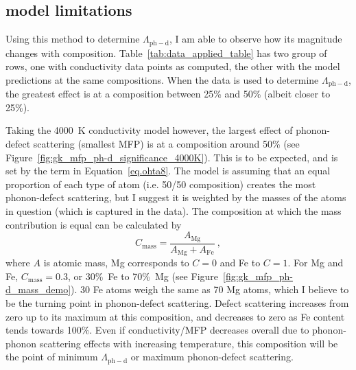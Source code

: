  





%
%



\subsection{\cocs model limitations}

Using this method to determine $\Lambda_{\mathrm{ph-d}}$, I am able to observe how its magnitude changes with composition. Table~\ref{tab:data_applied_table} has two group of rows, one with conductivity data points as computed, the other with the model predictions at the same compositions. When the data is used to determine $\Lambda_{\mathrm{ph-d}}$, the greatest effect is at a composition between 25\% and 50\% (albeit closer to 25\%). 

Taking the 4000~K conductivity model however, the largest effect of phonon-defect scattering (smallest MFP) is at a composition around 50\% (see Figure~\ref{fig:gk_mfp_ph-d_significance_4000K}). This is to be expected, and is set by the \cocs term in Equation~\ref{eq.ohta8}. The \cocs model is assuming that an equal proportion of each type of atom (i.e. 50/50 composition) creates the most phonon-defect scattering, but I suggest it is weighted by the masses of the atoms in question (which is captured in the data). The composition at which the mass contribution is equal can be calculated by
%
\begin{equation}
C_{\mathrm{mass}} = \frac{A_{\mathrm{Mg}}}{A_{\mathrm{Mg}} + A_{\mathrm{Fe}}}\ ,
\label{eq:mass_turnover_point}
\end{equation}
%
where $A$ is atomic mass, Mg corresponds to $C=0$ and Fe to $C=1$. For Mg and Fe, $C_{\mathrm{mass}} = 0.3$, or 30\%~Fe to 70\%~Mg (see Figure~\ref{fig:gk_mfp_ph-d_mass_demo}). 30 Fe atoms weigh the same as 70 Mg atoms, which I believe to be the turning point in phonon-defect scattering. Defect scattering increases from zero up to its maximum at this composition, and decreases to zero as Fe content tends towards 100\%. Even if conductivity/MFP decreases overall due to phonon-phonon scattering effects with increasing temperature, this composition will be the point of minimum $\Lambda_{\mathrm{ph-d}}$ or maximum phonon-defect scattering.



